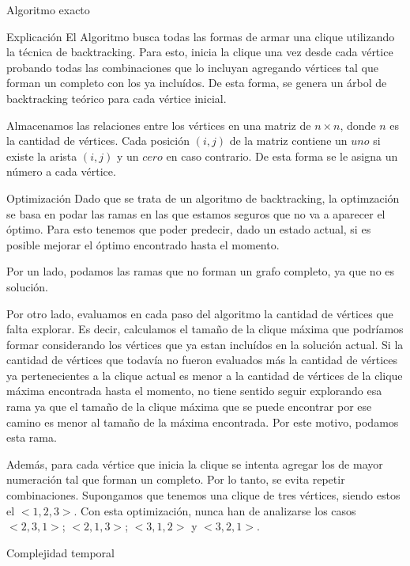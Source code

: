 \begin{section}{Algoritmo exacto}
		\begin{subsection}{Explicación}
			El Algoritmo busca todas las formas de armar una clique utilizando la técnica de backtracking. Para esto, inicia la clique una vez desde cada vértice probando todas las combinaciones que lo incluyan agregando vértices tal que forman un completo con los ya incluídos. De esta forma, se genera un árbol de backtracking teórico para cada vértice inicial.

			Almacenamos las relaciones entre los vértices en una matriz de $n \times n$, donde $n$ es la cantidad de vértices. Cada posición $(i,j)$ de la matriz contiene un $uno$ si existe la arista $(i,j)$ y un $cero$ en caso contrario. De esta forma se le asigna un número a cada vértice.\VSP
		\end{subsection}
		\begin{subsection}{Optimización}
			Dado que se trata de un algoritmo de backtracking, la optimzación se basa en podar las ramas en las que estamos seguros que no va a aparecer el óptimo. Para esto tenemos que poder predecir, dado un estado actual, si es posible mejorar el óptimo encontrado hasta el momento.
			
			Por un lado, podamos las ramas que no forman un grafo completo, ya que no es solución.
			
			Por otro lado, evaluamos en cada paso del algoritmo la cantidad de vértices que falta explorar. Es decir, calculamos el tamaño de la clique máxima que podríamos formar considerando los vértices que ya estan incluídos en la solución actual. Si la cantidad de vértices que todavía no fueron evaluados más la cantidad de vértices ya pertenecientes a la clique actual es menor a la cantidad de vértices de la clique máxima encontrada hasta el momento, no tiene sentido seguir explorando esa rama ya que el tamaño de la clique máxima que se puede encontrar por ese camino es menor al tamaño de la máxima encontrada. Por este motivo, podamos esta rama.

			Además, para cada vértice que inicia la clique se intenta agregar los de mayor numeración tal que forman un completo. Por lo tanto, se evita repetir combinaciones. Supongamos que tenemos una clique de tres vértices, siendo estos el $<1,2,3>$. Con esta optimización, nunca han de analizarse los casos $<2,3,1>$; $<2,1,3>$; $<3,1,2>$ y $<3,2,1>$.
		\end{subsection}
		\begin{subsection}{Complejidad temporal}
		
		\end{subsection}
\end{section}

